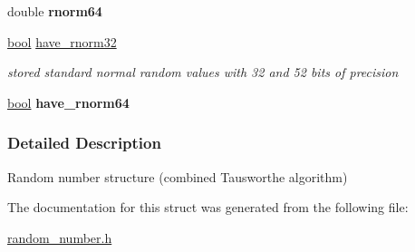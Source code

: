 \begin{DoxyCompactItemize}
\mbox{\label{structbiomcmc__rng__struct_a7e321a23ca5d7305a54374bf98358148}} 
double {\bfseries rnorm64}
\item 
\mbox{\label{structbiomcmc__rng__struct_a2d50ad99ab3615eb6ada4f176dc00f7d}} 
\hyperlink{lowlevel_8h_a97a80ca1602ebf2303258971a2c938e2}{bool} \hyperlink{structbiomcmc__rng__struct_a2d50ad99ab3615eb6ada4f176dc00f7d}{have\+\_\+rnorm32}
\begin{DoxyCompactList}\small\item\em stored standard normal random values with 32 and 52 bits of precision \end{DoxyCompactList}\item 
\mbox{\label{structbiomcmc__rng__struct_ad38ad14ad51ed51b49315cc944dc9bee}} 
\hyperlink{lowlevel_8h_a97a80ca1602ebf2303258971a2c938e2}{bool} {\bfseries have\+\_\+rnorm64}
\end{DoxyCompactItemize}


\subsubsection{Detailed Description}
Random number structure (combined Tausworthe algorithm) 

The documentation for this struct was generated from the following file\+:\begin{DoxyCompactItemize}
\item 
\hyperlink{random__number_8h}{random\+\_\+number.\+h}\end{DoxyCompactItemize}
